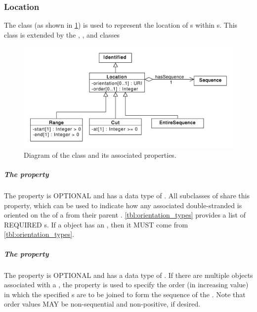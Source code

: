 
\subsubsection{Location}
\label{sec:Location}

The  class (as shown in \ref{uml:location}) is used to represent the location of s within s.  This class is extended by the , , and  classes

\begin{figure}[ht]
\begin{center}
\includegraphics[scale=0.6]{uml/location}
\caption[]{Diagram of the  class and its associated properties.}
\label{uml:location}
\end{center}
\end{figure} 

\subparagraph{The  property}
\label{sec:orientation:L}
The  property is OPTIONAL and has a data type of . All subclasses of  share this property, which can be used to indicate how any associated double-stranded  is oriented on the  of a  from their parent . \ref{tbl:orientation_types} provides a list of REQUIRED  s. If a  object has an , then it MUST come from \ref{tbl:orientation_types}.

\subparagraph{The  property}
\label{sec:order}
The  property is OPTIONAL and has a data type of .  If there are multiple  objects associated with a , the  property is used to specify the order (in increasing value) in which the specified s are to be joined to form the sequence of the .
Note that order values MAY be non-sequential and non-positive, if desired.

